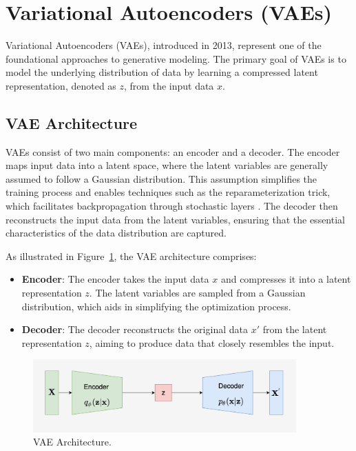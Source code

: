 \section{Variational Autoencoders (VAEs)}

Variational Autoencoders (VAEs), introduced in 2013, represent one of the foundational approaches to generative modeling. The primary goal of VAEs is to model the underlying distribution of data by learning a compressed latent representation, denoted as \(z\), from the input data \(x\).

\subsection{VAE Architecture}
VAEs consist of two main components: an encoder and a decoder. The encoder maps input data into a latent space, where the latent variables are generally assumed to follow a Gaussian distribution. This assumption simplifies the training process and enables techniques such as the reparameterization trick, which facilitates backpropagation through stochastic layers \citep{10.1561/2200000056}. The decoder then reconstructs the input data from the latent variables, ensuring that the essential characteristics of the data distribution are captured.

As illustrated in Figure~\ref{fig:VAE_structure}, the VAE architecture comprises:
\begin{itemize}
    \item \textbf{Encoder}: The encoder takes the input data \(x\) and compresses it into a latent representation \(z\). The latent variables are sampled from a Gaussian distribution, which aids in simplifying the optimization process.
    \item \textbf{Decoder}: The decoder reconstructs the original data \(x'\) from the latent representation \(z\), aiming to produce data that closely resembles the input.
\end{itemize}

\begin{figure}[H]
    \centering
    \includegraphics[width=0.9\textwidth]{./Images/VAE_structure.jpg}
    \caption{VAE Architecture.}
    \label{fig:VAE_structure}
\end{figure}

